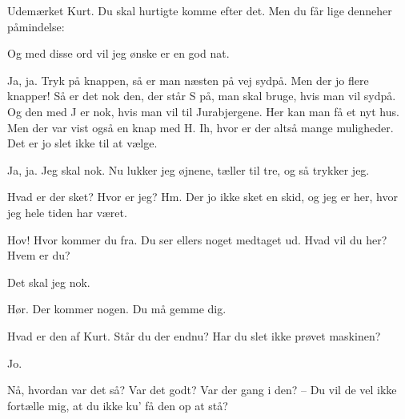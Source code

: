 \documentclass[a4paper,11pt]{article}
\begin{document}
\begin{sketch}
 Udemærket Kurt. Du skal hurtigte komme efter det. Men du får lige
denneher påmindelse:


 Og med disse ord vil jeg ønske er en god nat.


  Ja, ja. Tryk på knappen, så
er man næsten på vej sydpå.  Men der jo flere
knapper!  Så er det nok den, der står S på, man skal bruge,
hvis man vil sydpå. Og den med J er nok, hvis man vil til
Jurabjergene.  Her kan man få et
nyt hus. Men der var vist også en knap med H.  Ih, hvor
er der altså mange muligheder. Det er jo slet ikke til at vælge.


 Ja, ja. Jeg skal nok. Nu lukker jeg øjnene, tæller til tre, og så
trykker jeg. 

Hvad er der sket? Hvor er jeg?  Hm. Der jo ikke sket en skid,
og jeg er her, hvor jeg hele tiden har været. 

Hov! Hvor kommer du fra. Du ser ellers noget medtaget ud.  Hvad vil du her? Hvem er du?


  Det skal jeg nok.



 Hør. Der kommer nogen. Du må gemme dig. 


 Hvad er den af Kurt. Står du der endnu? Har du slet ikke prøvet
maskinen?

 Jo.

 Nå, hvordan var det så? Var det godt? Var der gang i den? -- Du vil de
vel ikke fortælle mig, at du ikke ku' få den op at stå?


\end{sketch}
\end{document}
